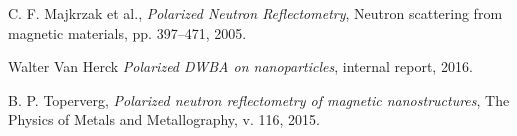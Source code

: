 \documentclass[12pt,a4paper]{article}
\begin{document}
\begin{thebibliography}{1}

 C. F. Majkrzak et al., {\em Polarized Neutron Reflectometry}, Neutron scattering from magnetic materials, pp. 397--471, 2005.

 Walter Van Herck {\em Polarized DWBA on nanoparticles}, internal report, 2016.

 B. P. Toperverg, {\em Polarized neutron reflectometry of magnetic nanostructures}, The Physics of Metals and Metallography, v. 116, 2015.

\end{thebibliography}
\end{document}
